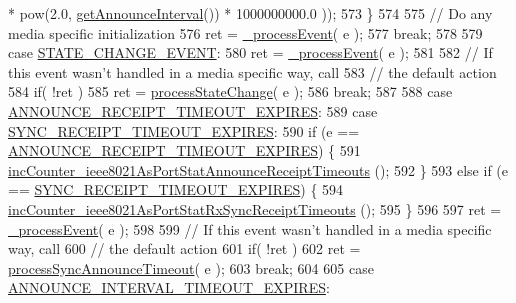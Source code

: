 \begin{DoxyCode}
       * pow(2.0, \hyperlink{class_common_port_a7aa1a5fddf7129f600c97c018087b7b8}{getAnnounceInterval}()) * 1000000000.0 ));
573         \}
574 
575         \textcolor{comment}{// Do any media specific initialization}
576         ret = \hyperlink{class_common_port_a8fdf705ad3f9d8794555fe1c611c19ec}{\_processEvent}( e );
577         \textcolor{keywordflow}{break};
578 
579     \textcolor{keywordflow}{case} \hyperlink{ieee1588_8hpp_a5667b805d857c6d28f83f6038a0272d3a39c91cfde69942bacf91a19587379be1}{STATE\_CHANGE\_EVENT}:
580         ret = \hyperlink{class_common_port_a8fdf705ad3f9d8794555fe1c611c19ec}{\_processEvent}( e );
581 
582         \textcolor{comment}{// If this event wasn't handled in a media specific way, call}
583         \textcolor{comment}{// the default action}
584         \textcolor{keywordflow}{if}( !ret )
585             ret = \hyperlink{class_common_port_a11047fcdc1e80ee322dba467a051698b}{processStateChange}( e );
586         \textcolor{keywordflow}{break};
587 
588     \textcolor{keywordflow}{case} \hyperlink{ieee1588_8hpp_a5667b805d857c6d28f83f6038a0272d3a7060ecc9be507f5c8828eedf6a163c8b}{ANNOUNCE\_RECEIPT\_TIMEOUT\_EXPIRES}:
589     \textcolor{keywordflow}{case} \hyperlink{ieee1588_8hpp_a5667b805d857c6d28f83f6038a0272d3ac09ed008614f57d58759e4fd5a3c9622}{SYNC\_RECEIPT\_TIMEOUT\_EXPIRES}:
590         \textcolor{keywordflow}{if} (e == \hyperlink{ieee1588_8hpp_a5667b805d857c6d28f83f6038a0272d3a7060ecc9be507f5c8828eedf6a163c8b}{ANNOUNCE\_RECEIPT\_TIMEOUT\_EXPIRES}) \{
591             \hyperlink{class_common_port_a05a0d76025b1ab762b3f27232d0090a5}{incCounter\_ieee8021AsPortStatAnnounceReceiptTimeouts}
      ();
592         \}
593         \textcolor{keywordflow}{else} \textcolor{keywordflow}{if} (e == \hyperlink{ieee1588_8hpp_a5667b805d857c6d28f83f6038a0272d3ac09ed008614f57d58759e4fd5a3c9622}{SYNC\_RECEIPT\_TIMEOUT\_EXPIRES}) \{
594             \hyperlink{class_common_port_adf1a589504e919c03125807f4d10e9e2}{incCounter\_ieee8021AsPortStatRxSyncReceiptTimeouts}
      ();
595         \}
596 
597         ret = \hyperlink{class_common_port_a8fdf705ad3f9d8794555fe1c611c19ec}{\_processEvent}( e );
598 
599         \textcolor{comment}{// If this event wasn't handled in a media specific way, call}
600         \textcolor{comment}{// the default action}
601         \textcolor{keywordflow}{if}( !ret )
602             ret = \hyperlink{class_common_port_aebebd8986a920f60f1ecc1f8e5a027d0}{processSyncAnnounceTimeout}( e );
603         \textcolor{keywordflow}{break};
604 
605     \textcolor{keywordflow}{case} \hyperlink{ieee1588_8hpp_a5667b805d857c6d28f83f6038a0272d3acd9bfe0c66373bb54c37784519f53d3a}{ANNOUNCE\_INTERVAL\_TIMEOUT\_EXPIRES}:

\end{DoxyCode}
